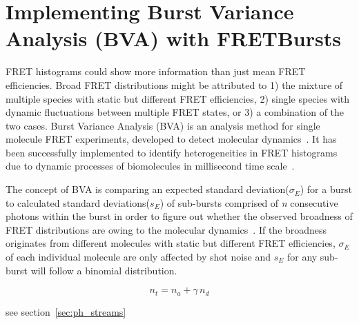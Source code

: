 \section{Implementing Burst Variance Analysis (BVA) with FRETBursts}

FRET histograms could show more information than just mean FRET efficiencies. Broad FRET distributions might be attributed to 1) the mixture of multiple species with static but different FRET efficiencies, 2) single species with dynamic fluctuations between multiple FRET states, or 3) a combination of the two cases. Burst Variance Analysis (BVA) is an analysis method for single molecule FRET experiments, developed to detect molecular dynamics~\cite{Torella_2011}. It has been successfully implemented to identify heterogeneities in FRET histograms due to dynamic processes of biomolecules in millisecond time scale~\cite{Torella_2011, Robb_2013}.

The concept of BVA is comparing an expected standard deviation($\sigma_E$) for a burst to calculated standard deviations($s_E$) of sub-bursts comprised of \textit{n} consecutive photons within the burst in order to figure out whether the observed broadness of FRET distributions are owing to the molecular dynamics~\cite{Torella_2011}. If the broadness originates from different molecules with static but different FRET efficiencies, $\sigma_E$ of each individual molecule are only affected by shot noise and $s_E$ for any sub-burst will follow a binomial distribution.  

$$ n_t = n_a + \gamma\,n_d$$ 

see section~\ref{sec:ph_streams}